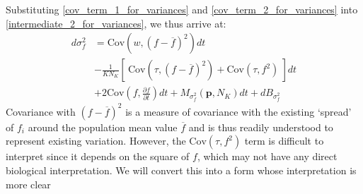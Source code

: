 Substituting \eqref{cov_term_1_for_variances} and \eqref{cov_term_2_for_variances} into \eqref{intermediate_2_for_variances}, we thus arrive at:
\begin{equation}
\label{intermediate_3_for_variances}
\begin{aligned}
d\sigma^2_{f} &= \textrm{Cov}\left(w,(f - \overline{f})^2\right)dt\\
&- \frac{1}{KN_K}\left[ \ \textrm{Cov}\left(\tau,(f - \overline{f})^2\right) + \textrm{Cov}(\tau,f^2) \ \right]dt\\
& + 2\textrm{Cov}\left(f, \frac{\partial f}{\partial t}\right)dt + M_{\sigma^2_f}(\mathbf{p},N_K)dt + dB_{\sigma^2_{f}}
\end{aligned}
\end{equation}
Covariance with $(f-\overline{f})^2$ is a measure of covariance with the existing `spread' of $f_i$ around the population mean value $\overline{f}$ and is thus readily understood to represent existing variation. However, the $\textrm{Cov}(\tau,f^2)$ term is difficult to interpret since it depends on the square of $f$, which may not have any direct biological interpretation. We will convert this into a form whose interpretation is more clear
